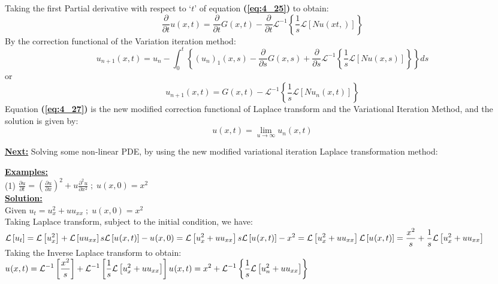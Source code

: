 \documentclass[12pt]{report}
\newcommand{\Laplace}{\mathcal{L}}
\newcommand{\Un}[2]{u_{#1}(#2)}
\newcommand{\NI}{\noindent}
\newcommand{\InverseL}[1]{\Laplace^{-1}\left[#1\right]}
\newcommand{\LT}[1]{\Laplace \left[#1\right]}
\newcommand{\Unx}[1]{\Un{#1}{x,t}}
\newcommand{\InverseLx}[1]{\Laplace^{-1}\left\{ #1 \right\}}
\newcommand{\bt}[1]{\textbf{#1}}
\newcommand{\refn}[1]{\bt{(\ref{#1})}}
\begin{document}
\NI Taking the first Partial derivative with respect to `$t$' of equation \refn{eq:4_25} to obtain:
\begin{equation}
	\frac{\partial}{\partial t}u(x,t) = \frac{\partial}{\partial t}G(x,t) - \frac{\partial}{\partial t}\Laplace^{-1}\left\{ \frac{1}{s}\LT{Nu(xt,)}\right\}
\end{equation}
By the correction functional of the Variation iteration method:
$$
\Unx{n+1} = u_n - \int_{0}^{t}\left\{ (u_n)_{1}(x,s) - \frac{\partial}{\partial s}G(x,s) + \frac{\partial}{\partial s}\InverseLx{\frac{1}{s} \LT{Nu(x,s)}} \right\}ds
$$
or
\begin{equation}
	\Unx{n+1} = G(x,t) - \InverseLx{\frac{1}{s}\LT{N\Un{n}{x,t}}} \label{eq:4_27}
\end{equation}
Equation \refn{eq:4_27} is the new modified correction functional of Laplace transform and the Variational Iteration Method, and the solution is given by:
\begin{equation}
	u(x,t) = \lim\limits_{u \rightarrow \infty} \Unx{n}
\end{equation}

\NI \textbf{\underline{Next:}} Solving some non-linear PDE, by using the new  modified variational iteration Laplace transformation method:

\newpage
\NI \textbf{\underline{Examples:}}\\[0.4cm]
(1) $\displaystyle
\frac{\partial u}{\partial t} = \left( \frac{\partial u}{\partial x}\right)^2 + u\frac{\partial^2 u}{\partial x^2} \; ; \; u(x,0) = x^2
$\\[0.4cm]
\NI \textbf{\underline{Solution:}}\\[0.2cm]
Given $\displaystyle u_t = u_{x}^{2} + u u_{xx} \; ; \; u(x,0) = x^2$\\[0.25cm]
Taking Laplace transform, subject to the initial condition, we  have:\\[0.2cm]
$\displaystyle
\LT{u_t} = \LT{u_{x}^{2}} + \LT{uu_{xx}}\\[0.2cm]
s\LT{\Un{}{x,t}} - \Un{}{x,0} = \LT{u_{x}^{2} + uu_{xx}} \\[0.2cm]
s\LT{\Un{}{x,t}} - x^2 = \LT{u_{x}^{2} + uu_{xx}} \\[0.2cm]
\LT{\Un{}{x,t}} = \frac{x^2}{s} + \frac{1}{s}\LT{u_{x}^{2} + uu_{xx}}
$\\[0.2cm]
Taking the Inverse Laplace transform to obtain:\\[0.3cm]
$\displaystyle
\Unx{} = \InverseL{\frac{x^2}{s}} + \InverseL{\frac{1}{s}\LT{u_{x}^{2} + uu_{xx}}} \\[0.2cm]
\Un{}{x,t} = x^2 + \InverseLx{\frac{1}{s}\LT{u_{n}^{2} + uu_{xx}}}
$
\end{document}
